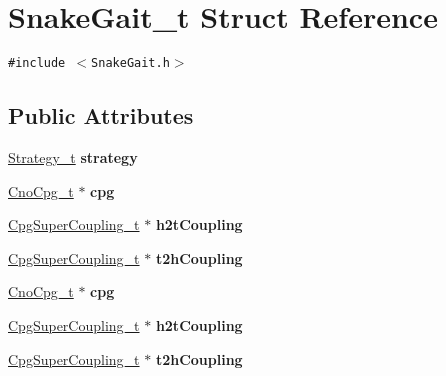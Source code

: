 \hypertarget{structSnakeGait__t}{
\section{SnakeGait\_\-t Struct Reference}
\label{structSnakeGait__t}
}
{\tt \#include $<$SnakeGait.h$>$}

\subsection*{Public Attributes}
\begin{CompactItemize}
\item 
\hypertarget{structSnakeGait__t_89233be1e47444c82e71485eccccd3ec}{
\hyperlink{structStrategy__t}{Strategy\_\-t} \textbf{strategy}}
\label{structSnakeGait__t_89233be1e47444c82e71485eccccd3ec}

\item 
\hypertarget{structSnakeGait__t_a2113e5e76d5d17387ae52f9cf0c9995}{
\hyperlink{structCnoCpg__t}{CnoCpg\_\-t} $\ast$ \textbf{cpg}}
\label{structSnakeGait__t_a2113e5e76d5d17387ae52f9cf0c9995}

\item 
\hypertarget{structSnakeGait__t_f93c4db9ad388a51b666f58a36538e78}{
\hyperlink{structCpgSuperCoupling__t}{CpgSuperCoupling\_\-t} $\ast$ \textbf{h2tCoupling}}
\label{structSnakeGait__t_f93c4db9ad388a51b666f58a36538e78}

\item 
\hypertarget{structSnakeGait__t_e7dba580e1bd4b3d12b501688c4db2c2}{
\hyperlink{structCpgSuperCoupling__t}{CpgSuperCoupling\_\-t} $\ast$ \textbf{t2hCoupling}}
\label{structSnakeGait__t_e7dba580e1bd4b3d12b501688c4db2c2}

\item 
\hypertarget{structSnakeGait__t_a2113e5e76d5d17387ae52f9cf0c9995}{
\hyperlink{structCnoCpg__t}{CnoCpg\_\-t} $\ast$ \textbf{cpg}}
\label{structSnakeGait__t_a2113e5e76d5d17387ae52f9cf0c9995}

\item 
\hypertarget{structSnakeGait__t_f93c4db9ad388a51b666f58a36538e78}{
\hyperlink{structCpgSuperCoupling__t}{CpgSuperCoupling\_\-t} $\ast$ \textbf{h2tCoupling}}
\label{structSnakeGait__t_f93c4db9ad388a51b666f58a36538e78}

\item 
\hypertarget{structSnakeGait__t_e7dba580e1bd4b3d12b501688c4db2c2}{
\hyperlink{structCpgSuperCoupling__t}{CpgSuperCoupling\_\-t} $\ast$ \textbf{t2hCoupling}}
\label{structSnakeGait__t_e7dba580e1bd4b3d12b501688c4db2c2}

\end{CompactItemize}


